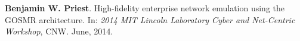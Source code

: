 \item \textbf{Benjamin W. Priest}.
	High-fidelity enterprise network emulation using the GOSMR architecture.
	In: \emph{2014 MIT Lincoln Laboratory Cyber and Net-Centric Workshop}, CNW.
	June, 2014.